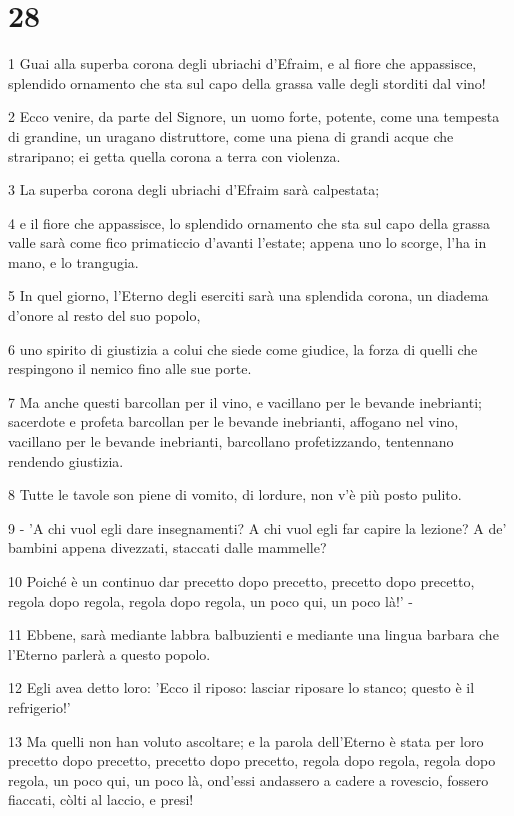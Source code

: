\chapter{28}

\par 1 Guai alla superba corona degli ubriachi d'Efraim, e al fiore che appassisce, splendido ornamento che sta sul capo della grassa valle degli storditi dal vino!
\par 2 Ecco venire, da parte del Signore, un uomo forte, potente, come una tempesta di grandine, un uragano distruttore, come una piena di grandi acque che straripano; ei getta quella corona a terra con violenza.
\par 3 La superba corona degli ubriachi d'Efraim sarà calpestata;
\par 4 e il fiore che appassisce, lo splendido ornamento che sta sul capo della grassa valle sarà come fico primaticcio d'avanti l'estate; appena uno lo scorge, l'ha in mano, e lo trangugia.
\par 5 In quel giorno, l'Eterno degli eserciti sarà una splendida corona, un diadema d'onore al resto del suo popolo,
\par 6 uno spirito di giustizia a colui che siede come giudice, la forza di quelli che respingono il nemico fino alle sue porte.
\par 7 Ma anche questi barcollan per il vino, e vacillano per le bevande inebrianti; sacerdote e profeta barcollan per le bevande inebrianti, affogano nel vino, vacillano per le bevande inebrianti, barcollano profetizzando, tentennano rendendo giustizia.
\par 8 Tutte le tavole son piene di vomito, di lordure, non v'è più posto pulito.
\par 9 - 'A chi vuol egli dare insegnamenti? A chi vuol egli far capire la lezione? A de' bambini appena divezzati, staccati dalle mammelle?
\par 10 Poiché è un continuo dar precetto dopo precetto, precetto dopo precetto, regola dopo regola, regola dopo regola, un poco qui, un poco là!' -
\par 11 Ebbene, sarà mediante labbra balbuzienti e mediante una lingua barbara che l'Eterno parlerà a questo popolo.
\par 12 Egli avea detto loro: 'Ecco il riposo: lasciar riposare lo stanco; questo è il refrigerio!'
\par 13 Ma quelli non han voluto ascoltare; e la parola dell'Eterno è stata per loro precetto dopo precetto, precetto dopo precetto, regola dopo regola, regola dopo regola, un poco qui, un poco là, ond'essi andassero a cadere a rovescio, fossero fiaccati, còlti al laccio, e presi!
